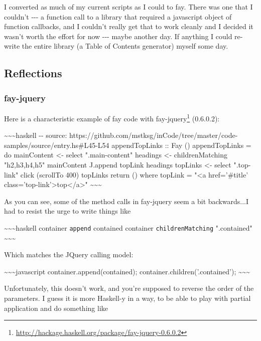 \documentclass[]{article}
\renewcommand{\href}[2]{#2\footnote{\url{#1}}}
\begin{document}
I converted as much of my current scripts as I could to fay. There was one that
I couldn't -\/-\/- a function call to a library that required a javascript
object of function callbacks, and I couldn't really get that to work cleanly and
I decided it wasn't worth the effort for now -\/-\/- maybe another day. If
anything I could re-write the entire library (a Table of Contents generator)
myself some day.

\subsection{Reflections}

\subsubsection{fay-jquery}

Here is a characteristic example of fay code with
\href{http://hackage.haskell.org/package/fay-jquery-0.6.0.2}{fay-jquery}
(0.6.0.2):

\textasciitilde{}\textasciitilde{}\textasciitilde{}haskell -\/- source:
https://github.com/mstksg/inCode/tree/master/code-samples/source/entry.hs\#L45-L54
appendTopLinks :: Fay () appendTopLinks = do mainContent \textless{}- select
".main-content" headings \textless{}- childrenMatching "h2,h3,h4,h5" mainContent
J.append topLink headings topLinks \textless{}- select ".top-link" click
(scrollTo 400) topLinks return () where topLink = "\textless{}a href='\#title'
class='top-link'\textgreater{}top\textless{}/a\textgreater{}"
\textasciitilde{}\textasciitilde{}\textasciitilde{}

As you can see, some of the method calls in fay-jquery seem a bit backwards...I
had to resist the urge to write things like

\textasciitilde{}\textasciitilde{}\textasciitilde{}haskell container
\texttt{append} contained container \texttt{childrenMatching} ".contained"
\textasciitilde{}\textasciitilde{}\textasciitilde{}

Which matches the JQuery calling model:

\textasciitilde{}\textasciitilde{}\textasciitilde{}javascript
container.append(contained); container.children('.contained');
\textasciitilde{}\textasciitilde{}\textasciitilde{}

Unfortunately, this doesn't work, and you're supposed to reverse the order of
the parameters. I guess it is more Haskell-y in a way, to be able to play with
partial application and do something like
\end{document}
